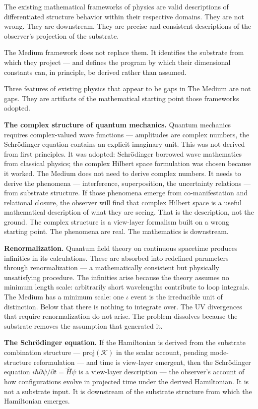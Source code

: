 \documentclass[11pt,letterpaper]{article}
\newcommand{\Kappa}{\mathcal{K}}
\begin{document}
The existing mathematical frameworks of physics are valid descriptions of differentiated structure behavior within their respective domains. They are not wrong. They are downstream. They are precise and consistent descriptions of the observer's projection of the substrate.

The Medium framework does not replace them. It identifies the substrate from which they project --- and defines the program by which their dimensional constants can, in principle, be derived rather than assumed.

Three features of existing physics that appear to be gaps in The Medium are not gaps. They are artifacts of the mathematical starting point those frameworks adopted.

\textbf{The complex structure of quantum mechanics.} Quantum mechanics requires complex-valued wave functions --- amplitudes are complex numbers, the Schrödinger equation contains an explicit imaginary unit. This was not derived from first principles. It was adopted: Schrödinger borrowed wave mathematics from classical physics; the complex Hilbert space formulation was chosen because it worked. The Medium does not need to derive complex numbers. It needs to derive the phenomena --- interference, superposition, the uncertainty relations --- from substrate structure. If those phenomena emerge from co-manifestation and relational closure, the observer will find that complex Hilbert space is a useful mathematical description of what they are seeing. That is the description, not the ground. The complex structure is a view-layer formalism built on a wrong starting point. The phenomena are real. The mathematics is downstream.

\textbf{Renormalization.} Quantum field theory on continuous spacetime produces infinities in its calculations. These are absorbed into redefined parameters through renormalization --- a mathematically consistent but physically unsatisfying procedure. The infinities arise because the theory assumes no minimum length scale: arbitrarily short wavelengths contribute to loop integrals. The Medium has a minimum scale: one \(\iota\) event is the irreducible unit of distinction. Below that there is nothing to integrate over. The UV divergences that require renormalization do not arise. The problem dissolves because the substrate removes the assumption that generated it.

\textbf{The Schrödinger equation.} If the Hamiltonian is derived from the substrate combination structure --- \(\mathrm{proj}(\Kappa)\) in the scalar account, pending mode-structure reformulation --- and time is view-layer emergent, then the Schrödinger equation \(i\hbar \partial\psi/\partial t = \hat{H}\psi\) is a view-layer description --- the observer's account of how configurations evolve in projected time under the derived Hamiltonian. It is not a substrate input. It is downstream of the substrate structure from which the Hamiltonian emerges.
\end{document}
